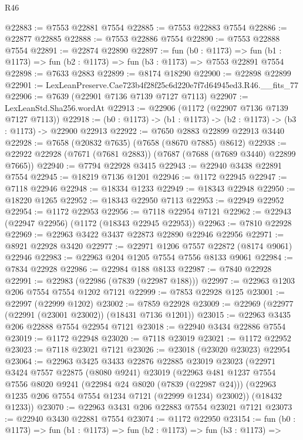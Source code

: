 \begin{lexlean}{R46}
\begin{coremodule}
@22883 := @7553 @22881 @7554
@22885 := @7553 @22883 @7554
@22886 := @22877 @22885
@22888 := @7553 @22886 @7554
@22890 := @7553 @22888 @7554
@22891 := @22874 @22890
@22897 := fun (b0 : @1173) =>
  fun (b1 : @1173) => fun (b2 : @1173) => fun (b3 : @1173) => @7553 @22891 @7554
@22898 := @7633 @2883
@22899 := @8174 @18290
@22900 := @22898 @22899
@22901 := LexLeanPreserve.Cae723b4f28f25c6d220e7f7d64945ed3.R46.__fits_77
@22906 := @7639 (@22901 @7136 @7139 @7127 @7113)
@22907 := LexLeanStd.Sha256.wordAt
@22913 := @22906 (@1172 (@22907 @7136 @7139 @7127 @7113))
@22918 := (b0 : @1173) -> (b1 : @1173) -> (b2 : @1173) -> (b3 : @1173) -> @22900 @22913
@22922 := @7650 @2883 @22899 @22913 @3440
@22928 := @7658 (@20832 @7635) (@7658 (@8670 @7885) @8612)
@22938 := @22922 @22928 (@7671 (@7681 @2883)) (@7687 (@7688 (@7689 @3440) @22899 @7665))
@22940 := @7794 @22928 @3415
@22943 := @22940 @3438 @22891 @7554
@22945 := @18219 @7136 @1201
@22946 := @1172 @22945
@22947 := @7118 @22946
@22948 := @18334 @1233
@22949 := @18343 @22948
@22950 := @18220 @1265
@22952 := @18343 @22950 @7113
@22953 := @22949 @22952
@22954 := @1172 @22953
@22956 := @7118 @22954 @7121
@22962 := @22943 (@22947 @22956) (@1172 (@18343 @22945 @22953))
@22963 := @7810 @22928
@22969 := @22963 @3422 @3437 @22873 @22890 @22946 @22956
@22971 := @8921 @22928 @3420
@22977 := @22971 @1206 @7557 @22872 (@8174 @9061) @22946
@22983 := @22963 @204 @1205 @7554 @7556 @8133 @9061
@22984 := @7834 @22928
@22986 := @22984 @188 @8133
@22987 := @7840 @22928
@22991 := @22983 (@22986 (@7839 (@22987 @188)))
@22997 := @22963 @1203 @206 @7554 @7554 @1202 @7121
@22999 := @7853 @22928 @125
@23001 := @22997 (@22999 @1202)
@23002 := @7859 @22928
@23009 := @22969 (@22977 (@22991 (@23001 @23002)) (@18431 @7136 @1201))
@23015 := @22963 @3435 @206 @22888 @7554 @22954 @7121
@23018 := @22940 @3434 @22886 @7554
@23019 := @1172 @22948
@23020 := @7118 @23019
@23021 := @1172 @22952
@23023 := @7118 @23021 @7121
@23026 := @23018 (@23020 @23023) @22954
@23064 := @22963
    @3425
    @3433
    @22876
    @22885
    @23019
    @23023
    (@22971
      @3424
      @7557
      @22875
      (@8080 @9241)
      @23019
      (@22963
        @481
        @1237
        @7554
        @7556
        @8020
        @9241
        (@22984 @24 @8020 (@7839 (@22987 @24)))
        (@22963 @1235 @206 @7554 @7554 @1234 @7121 (@22999 @1234) @23002))
      (@18432 @1233))
@23070 := @22963 @3431 @206 @22883 @7554 @23021 @7121
@23073 := @22940 @3430 @22881 @7554
@23074 := @1172 @22950
@23154 := fun (b0 : @1173) =>
  fun (b1 : @1173) =>
  fun (b2 : @1173) =>
  fun (b3 : @1173) =>

\end{coremodule}
\end{lexlean}
